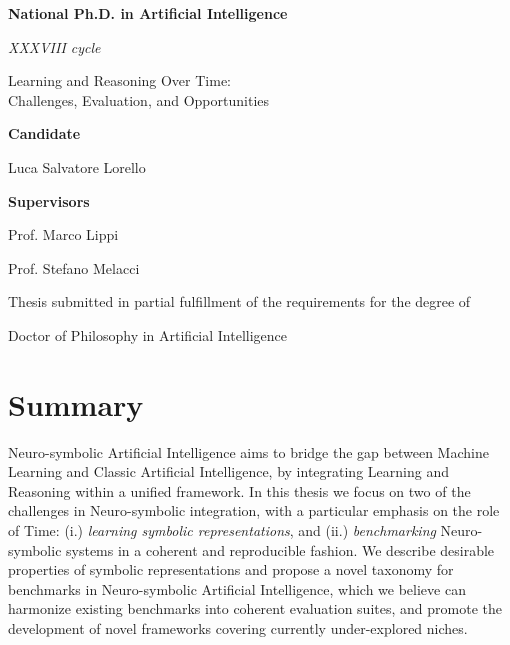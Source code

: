 \documentclass[a4paper,twoside,openright]{book}
\theoremstyle{plain}
\theoremstyle{definition}
\begin{document}
\begin{titlepage}
    \vspace{0.3cm}
    {\Large \textbf{National Ph.D. in Artificial Intelligence}\par}
    \vspace{0.3cm}
    {\normalfont \textit{XXXVIII cycle} \par}
    \vspace{2.3cm}
    
    {\normalfont\bfseries\boldmath\LARGE
    \begin{center}
		Learning and Reasoning Over Time:\\
        Challenges, Evaluation, and Opportunities
    \end{center}
    }	
	
    \vspace{3.9cm}
	
    \begin{minipage}[t]{0.45\textwidth}
    \centering
        \large
        \textbf{Candidate}\par
        Luca Salvatore Lorello\par
    \end{minipage}
    \hfill
    \begin{minipage}[t]{0.45\textwidth}
    \centering
        \large
        \textbf{Supervisors}\par
        Prof. Marco Lippi\par
        Prof. Stefano Melacci\par
    \end{minipage}


    \vfill
    Thesis submitted in partial fulfillment of the requirements for the degree of \par
    Doctor of Philosophy in Artificial Intelligence
\end{titlepage}

\newpage

\frontmatter

\thispagestyle{empty}

\setcounter{page}{-1}
\chapter{Summary}
Neuro-symbolic Artificial Intelligence aims to bridge the gap between Machine Learning and Classic Artificial Intelligence, by integrating Learning and Reasoning within a unified framework. In this thesis we focus on two of the challenges in Neuro-symbolic integration, with a particular emphasis on the role of Time: (i.) \textit{learning symbolic representations}, and (ii.) \textit{benchmarking} Neuro-symbolic systems in a coherent and reproducible fashion.
We describe desirable properties of symbolic representations and propose a novel taxonomy for benchmarks in Neuro-symbolic Artificial Intelligence, which we believe can harmonize existing benchmarks into coherent evaluation suites, and promote the development of novel frameworks covering currently under-explored niches.
\end{document}
